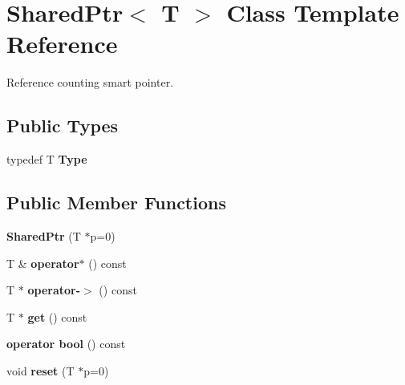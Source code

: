\hypertarget{class_shared_ptr}{}\section{Shared\+Ptr$<$ T $>$ Class Template Reference}
\label{class_shared_ptr}


Reference counting smart pointer.  


\subsection*{Public Types}
\begin{DoxyCompactItemize}
\item 
\mbox{\label{class_shared_ptr_a6f8522e4cfee9ec484fa9fec9a37d0f1}} 
typedef T {\bfseries Type}
\end{DoxyCompactItemize}
\subsection*{Public Member Functions}
\begin{DoxyCompactItemize}
\item 
\mbox{\label{class_shared_ptr_a7f00a1fb22e4d2a1b3cb55ec89d8dd99}} 
{\bfseries Shared\+Ptr} (T $\ast$p=0)
\item 
\mbox{\label{class_shared_ptr_a5dd1369844f0aa9b426b7b441c4f21c5}} 
T \& {\bfseries operator$\ast$} () const
\item 
\mbox{\label{class_shared_ptr_ae1d89cf0ffab4a7f80aa989c107867f9}} 
T $\ast$ {\bfseries operator-\/$>$} () const
\item 
\mbox{\label{class_shared_ptr_a49ccede7111c7d25c1b1752b8ede30f5}} 
T $\ast$ {\bfseries get} () const
\item 
\mbox{\label{class_shared_ptr_af4dc3e32a591fbce838eb74a3b1593ce}} 
{\bfseries operator bool} () const
\item 
\mbox{\label{class_shared_ptr_a0b0f0066a893260cffd468be2e57aaea}} 
void {\bfseries reset} (T $\ast$p=0)
\end{DoxyCompactItemize}


